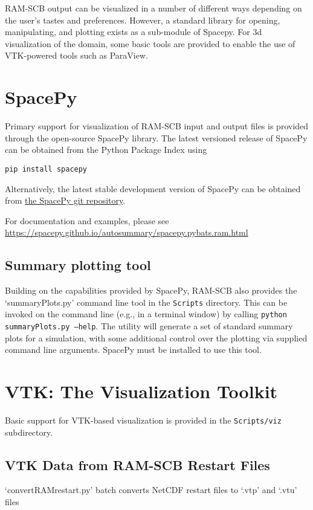 RAM-SCB output can be visualized in a number of different ways depending on the user's tastes and preferences.  However, a standard library for opening, manipulating, and plotting exists as a sub-module of Spacepy. For 3d visualization of the domain, some basic tools are provided to enable the use of VTK-powered tools such as ParaView.

\section{SpacePy}
Primary support for visualization of RAM-SCB input and output files is provided through the open-source SpacePy library. The latest versioned release of SpacePy can be obtained from the Python Package Index using
\begin{verbatim}
pip install spacepy
\end{verbatim}

Alternatively, the latest stable development version of SpacePy can be obtained from \href{https://github.com/spacepy/spacepy}{the SpacePy git repository}.

For documentation and examples, please see \href{https://spacepy.github.io/autosummary/spacepy.pybats.ram.html}{https://spacepy.github.io/autosummary/spacepy.pybats.ram.html}

\subsection{Summary plotting tool}
Building on the capabilities provided by SpacePy, RAM-SCB also provides the `summaryPlots.py' command line tool in the {\tt Scripts} directory. This can be invoked on the command line (e.g., in a terminal window) by calling {\tt python summaryPlots.py --help}. The utility will generate a set of standard summary plots for a simulation, with some additional control over the plotting via supplied command line arguments. SpacePy must be installed to use this tool.

\section{VTK: The Visualization Toolkit}
Basic support for VTK-based visualization is provided in the {\tt Scripts/viz} subdirectory.

\subsection{VTK Data from RAM-SCB Restart Files}
`convertRAMrestart.py' batch converts NetCDF restart files to `.vtp' and `.vtu' files

